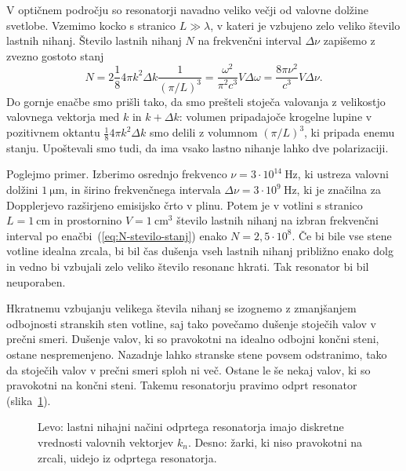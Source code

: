 V optičnem področju so resonatorji navadno veliko večji
od valovne dolžine svetlobe. Vzemimo kocko s stranico $L\gg \lambda$, 
v kateri je vzbujeno zelo veliko število lastnih nihanj. Število lastnih nihanj $N$ 
na frekvenčni interval $\Delta \nu$ zapišemo z zvezno gostoto stanj
\begin{equation}
N=2 \frac{1}{8} 4\pi k^{2}\Delta k \frac{1}{(\pi/L)^3}=\frac{\omega^{2}}{\pi^{2}c^{3}}V\Delta\omega=
\frac{8\pi \nu^{2}}{c^{3}}V\Delta\nu.
\label{eq:N-stevilo-stanj}
\end{equation}
Do gornje enačbe smo prišli tako, da smo prešteli stoječa valovanja z velikostjo
valovnega vektorja med $k$ in $k+\Delta k$: volumen pripadajoče krogelne lupine v pozitivnem oktantu
$\frac{1}{8} 4\pi k^{2}\Delta k$ smo delili z volumnom $(\pi/L)^3$, ki pripada enemu stanju. 
Upoštevali smo tudi, da ima vsako lastno nihanje lahko dve polarizaciji.

Poglejmo primer. Izberimo osrednjo frekvenco $\nu=3\cdot10^{14}~\si{\hertz}$, ki
ustreza valovni dolžini $1~\si{\micro\metre}$, in širino frekvenčnega
intervala $\Delta\nu=3\cdot10^{9}~\si{\hertz}$, ki je značilna za Dopplerjevo
razširjeno emisijsko črto v plinu. 
Potem je v votlini s stranico $L=1~\si{\centi\metre}$ 
in prostornino $V=1~\si{\centi\metre^3}$ število lastnih nihanj na izbran frekvenčni interval 
po enačbi~(\ref{eq:N-stevilo-stanj}) enako
$N=2,5\cdot10^{8}$. Če bi bile vse stene votline idealna zrcala,
bi bil čas dušenja vseh lastnih nihanj približno enako dolg in vedno bi vzbujali
zelo veliko število resonanc hkrati. Tak resonator bi bil neuporaben.

Hkratnemu vzbujanju velikega števila nihanj se izognemo z zmanjšanjem odbojnosti
stranskih sten votline, saj tako povečamo dušenje stoječih valov v prečni smeri.
Dušenje valov, ki so pravokotni na idealno odbojni končni steni, ostane nespremenjeno.
Nazadnje lahko stranske stene povsem odstranimo, tako da stoječih valov v prečni smeri
sploh ni več. Ostane le še nekaj valov, ki so pravokotni na končni
steni. Takemu resonatorju pravimo odprt resonator 
(slika~\ref{fig:Odprt_resonator}).
\begin{figure}[h]
\centering
\def\svgwidth{120truemm} 

\caption{Levo: lastni nihajni načini odprtega resonatorja imajo 
diskretne vrednosti valovnih vektorjev $k_{n}$. Desno: žarki, ki niso pravokotni na zrcali, 
uidejo iz odprtega resonatorja.}
\label{fig:Odprt_resonator}
\end{figure}

